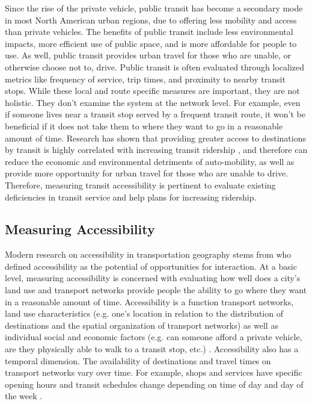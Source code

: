 \documentclass[11 pt, letterpaper]{article}
\begin{document}
{Since the rise of the private vehicle, public transit has become a secondary mode in most North American urban regions, due to offering less mobility and access than private vehicles. The benefits of public transit include less environmental impacts, more efficient use of public space, and is more affordable for people to use. As well, public transit provides urban travel for those who are unable, or otherwise choose not to, drive. Public transit is often evaluated through localized metrics like frequency of service, trip times, and proximity to nearby transit stops. While these local and route specific measures are important, they are not holistic. They don't examine the system at the network level. For example, even if someone lives near a transit stop served by a frequent transit route, it won't be beneficial if it does not take them to where they want to go in a reasonable amount of time. Research has shown that providing greater access to destinations by transit is highly correlated with increasing transit ridership \cite{owen2015}, and therefore can reduce the economic and environmental detriments of auto-mobility, as well as provide more opportunity for urban travel for those who are unable to drive. Therefore, measuring transit accessibility is pertinent to evaluate existing deficiencies in transit service and help plans for increasing ridership.




\subsection{Measuring Accessibility}

Modern research on accessibility in transportation geography stems from  who defined accessibility as the potential of opportunities for interaction. At a basic level, measuring accessibility is concerned with evaluating how well does a city's land use and transport networks provide people the ability to go where they want in a reasonable amount of time. Accessibility is a function transport networks, land use characteristics (e.g. one's location in relation to the distribution of destinations and the spatial organization of transport networks) as well as individual social and economic factors (e.g. can someone afford a private vehicle, are they physically able to walk to a transit stop, etc.) \cite{hanson1982, geurs2004}. Accessibility also has a temporal dimension. The availability of destinations and travel times on transport networks vary over time. For example, shops and services have specific opening hours and transit schedules change depending on time of day and day of the week .

}
\end{document}
